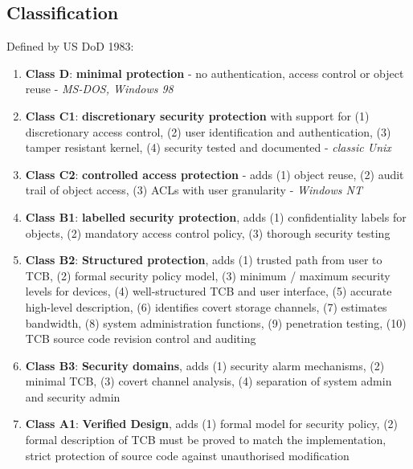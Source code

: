 \documentclass{article}
\begin{document}
\subsection{Classification}
Defined by US DoD 1983:
\begin{enumerate}
	\item \textbf{Class D}: \textbf{minimal protection} - no authentication, access control or object reuse - \textit{MS-DOS, Windows 98}
	
	\item \textbf{Class C1}: \textbf{discretionary security protection} with support for (1) discretionary access control, (2) user identification and authentication, (3) tamper resistant kernel, (4) security tested and documented - \textit{classic Unix}
	
	\item \textbf{Class C2}: \textbf{controlled access protection} - adds (1) object reuse, (2) audit trail of object access, (3) ACLs with user granularity - \textit{Windows NT}
	
	\item \textbf{Class B1}: \textbf{labelled security protection}, adds (1) confidentiality labels for objects, (2) mandatory access control policy, (3) thorough security testing
	
	\item \textbf{Class B2}: \textbf{Structured protection}, adds (1) trusted path from user to TCB, (2) formal security policy model, (3) minimum / maximum security levels for devices, (4) well-structured TCB and user interface, (5) accurate high-level description, (6) identifies covert storage channels, (7) estimates bandwidth, (8) system administration functions, (9) penetration testing, (10) TCB source code revision control and auditing
	
	\item \textbf{Class B3}: \textbf{Security domains}, adds (1) security alarm mechanisms, (2) minimal TCB, (3) covert channel analysis, (4) separation of system admin and security admin
	
	\item \textbf{Class A1}: \textbf{Verified Design}, adds (1) formal model for security policy, (2) formal description of TCB must be proved to match the implementation, strict protection of source code against unauthorised modification
\end{enumerate}
\end{document}
